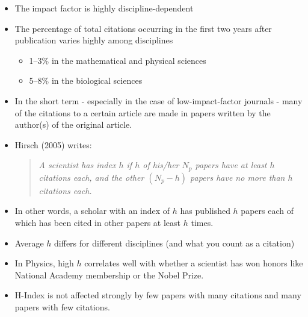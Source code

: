 \documentclass[a4paper,landscape,headrule,footrule,xetex]{foils}
\begin{document}
\begin{itemize}
\item The impact factor is highly discipline-dependent
\item The percentage of total citations occurring in the first two years after publication varies highly among disciplines
  \begin{itemize}
  \item 1--3\%  in the mathematical and physical sciences
  \item 5--8\% in the biological sciences
  \end{itemize}
\item In the short term - especially in the case of low-impact-factor journals - many of the citations to a certain article are made in papers written by the author(s) of the original article.
\end{itemize}


\begin{itemize}
\item  Hirsch (2005) writes:

\begin{quote} \itshape{}
  A scientist has index $h$ if $h$ of his/her $N_p$ papers have at least $h$
  citations each, and the other $(N_p - h)$ papers have no more than $h$
  citations each.
\end{quote}
\item In other words, a scholar with an index of $h$ has published $h$ papers
  each of which has been cited in other papers at least $h$ times.
\item Average $h$ differs for different disciplines (and what you count as a citation)
\item In Physics, high $h$ correlates well with whether a scientist has won honors like
  National Academy membership or the Nobel Prize.
\item H-Index is not affected strongly by few papers with many citations and
  many papers with few citations.
\end{itemize}
\newpage
\end{document}
